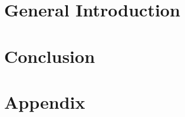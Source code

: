 \documentclass[12pt,a4paper,twoside,openright]{book}
\begin{document}
\begin{sloppy}
\chapter{General Introduction\label{ch:introduction}}
\thispagestyle{empty}
\newpage
\begin{refsection}

\newpage
\printbibliography
\end{refsection}


\newpage
\chapter{Conclusion \label{ch:conclusion}}
\thispagestyle{empty}
\newpage


\appendix
\chapter{Appendix}





\end{sloppy}
\end{document}
